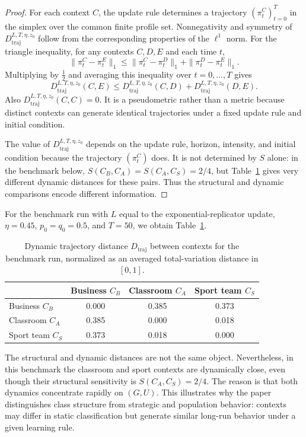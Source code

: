 \documentclass[a4paper,fleqn]{cas-dc}
\theoremstyle{remark}
\begin{document}
\begin{proof}
For each context $C$, the update rule determines a trajectory $(\pi_t^C)_{t=0}^T$ in the simplex over the common finite profile set. Nonnegativity and symmetry of $D_{\mathrm{traj}}^{L,T,\eta,z_0}$ follow from the corresponding properties of the $\ell^1$ norm. For the triangle inequality, for any contexts $C,D,E$ and each time $t$,
\[
\|\pi_t^C-\pi_t^E\|_1\le \|\pi_t^C-\pi_t^D\|_1+\|\pi_t^D-\pi_t^E\|_1.
\]
Multiplying by $\tfrac12$ and averaging this inequality over $t=0,\dots,T$ gives
\[
D_{\mathrm{traj}}^{L,T,\eta,z_0}(C,E)\le D_{\mathrm{traj}}^{L,T,\eta,z_0}(C,D)+D_{\mathrm{traj}}^{L,T,\eta,z_0}(D,E).
\]
Also $D_{\mathrm{traj}}^{L,T,\eta,z_0}(C,C)=0$. It is a pseudometric rather than a metric because distinct contexts can generate identical trajectories under a fixed update rule and initial condition.

The value of $D_{\mathrm{traj}}^{L,T,\eta,z_0}$ depends on the update rule, horizon, intensity, and initial condition because the trajectory $(\pi_t^C)$ does. It is not determined by $S$ alone: in the benchmark below, $S(C_B,C_A)=S(C_A,C_S)=2/4$, but Table~\ref{tab:traj-distance} gives very different dynamic distances for these pairs. Thus the structural and dynamic comparisons encode different information.
\end{proof}

For the benchmark run with $L$ equal to the exponential-replicator update, $\eta=0.45$, $p_0=q_0=0.5$, and $T=50$, we obtain Table~\ref{tab:traj-distance}.

\begin{table}[t]
\centering
\small
\begin{tabular}{lccc}
\toprule
 & Business $C_B$ & Classroom $C_A$ & Sport team $C_S$\\
\midrule
Business $C_B$ & 0.000 & 0.385 & 0.373 \\
Classroom $C_A$ & 0.385 & 0.000 & 0.018 \\
Sport team $C_S$ & 0.373 & 0.018 & 0.000 \\
\bottomrule
\end{tabular}
\caption{Dynamic trajectory distance $D_{\mathrm{traj}}$ between contexts for the benchmark run, normalized as an averaged total-variation distance in $[0,1]$.}
\label{tab:traj-distance}
\end{table}

The structural and dynamic distances are not the same object. Nevertheless, in this benchmark the classroom and sport contexts are dynamically close, even though their structural sensitivity is $S(C_A,C_S)=2/4$. The reason is that both dynamics concentrate rapidly on $(G,U)$. This illustrates why the paper distinguishes class structure from strategic and population behavior: contexts may differ in static classification but generate similar long-run behavior under a given learning rule.
\end{document}
